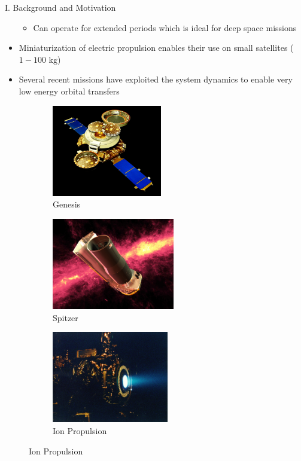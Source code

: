 \documentclass[final, usenames, dvipsnames]{beamer}
\newlength{\onecolwidth}
\begin{document}
\begin{frame}[t]
\begin{columns}[T,onlytextwidth]
\begin{column}{\onecolwidth}
\begin{block}{I. Background and Motivation}
\begin{itemize}
\begin{itemize}
				\item Can operate for extended periods which is ideal for deep space missions  
			\end{itemize}
		\item Miniaturization of electric propulsion enables their use on small satellites (\( 1 - 100 \text{ kg} \))
		\item Several recent missions have exploited the system dynamics to enable very low energy orbital transfers
	\end{itemize}
	\begin{figure}
        \hspace*{\fill}%
        \begin{subfigure}[b]{0.2\columnwidth}%
                \includegraphics[height=4cm]{genesis_sc}%
                \caption*{Genesis}%
                \label{fig:genesis}%
        \end{subfigure}%
        \hfill%
        \begin{subfigure}[b]{0.2\columnwidth}%
                \includegraphics[height=4cm]{spitzer}%
                \caption*{Spitzer}%
                \label{fig:soho}%
        \end{subfigure}%
        \hfill%
		 \begin{subfigure}[b]{0.2\columnwidth}%
            \includegraphics[height=4cm]{nstar_firing}%
            \caption*{Ion Propulsion}%
            \label{fig:isee3}%
        \end{subfigure}%
		\hspace*{\fill}%
		\label{fig:intro}
	\end{figure}
\end{block} %


\end{column}
\end{columns}
\end{frame}
\end{document}
